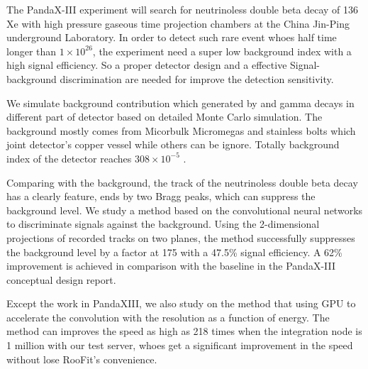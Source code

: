 \begin{eabstract}
	The PandaX-III experiment will search for neutrinoless double beta decay of 136 Xe with high pressure gaseous time projection chambers at the China Jin-Ping underground Laboratory. In order to detect such rare event whoes half time longer than $1\times10^{26}$, the experiment need a super low background index with a high signal efficiency. So a proper detector design and a effective Signal-background discrimination are needed for improve the detection sensitivity.

	We simulate background contribution which generated by \utte and \thttt gamma decays in different part of detector based on detailed Monte Carlo simulation. The background mostly comes from Micorbulk Micromegas and stainless bolts which joint detector's copper vessel while others can be ignore. Totally background index of the detector reaches $308\times 10^{-5}$ \ckky.

	Comparing with the background, the track of the neutrinoless double beta decay has a clearly feature,  ends by two Bragg peaks, which can suppress the background level. We study a method based on the convolutional neural networks to discriminate signals against the background. Using the 2-dimensional projections of recorded tracks on two planes, the method successfully suppresses the background level by a factor at 175 with a 47.5\% signal efficiency. A 62\% improvement is achieved in comparison with the baseline in the PandaX-III conceptual design report.

	Except the work in PandaXIII, we also study on the method that using GPU to accelerate the convolution with the resolution as a function of energy. The method can improves the speed as high as 218 times when the integration node is 1 million with our test server, whoes get a significant improvement in the speed without lose RooFit's convenience. 

\end{eabstract}

